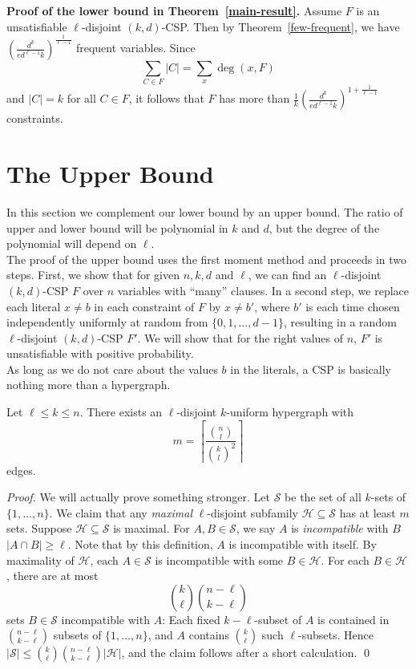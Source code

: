 \documentclass[envcountsect, envcountsame]{llncs}
\begin{document}
\textbf{Proof of the lower bound in Theorem~\ref{main-result}.}
Assume $F$ is an unsatisfiable $\ell$-disjoint $(k,d)$-CSP. Then by
Theorem~\ref{few-frequent}, we have
$\left(\frac{d^k}{ed^{\ell-1}k}\right)^{\frac{1}{\ell -1}}$ frequent
variables. Since
$$
\sum_{C\in F} |C| = \sum_x \deg(x,F)
$$
and $|C| = k$ for all $C\in F$, it follows that $F$ has more than
$\frac{1}{k} \left(\frac{d^k}{ed^{\ell
      -1}k}\right)^{1+\frac{1}{\ell-1}}$ constraints.

\section{The Upper Bound}

In this section we complement our lower bound by an upper bound. The
ratio of upper and lower bound will be polynomial in $k$ and $d$, but
the degree of the polynomial will depend on $\ell$.  \\

The proof of the upper bound uses the first moment method and proceeds
in two steps. First, we show that for given $n, k, d$ and $\ell$, we
can find an $\ell$-disjoint $(k,d)$-CSP $F$ over $n$ variables with
``many'' clauses. In a second step, we replace each literal $x \ne b$
in each constraint of $F$ by $x \ne b'$, where $b'$ is each time
chosen independently uniformly at random from $\{0,1,\dots,d-1\}$,
resulting in a random $\ell$-disjoint $(k,d)$-CSP $F'$.  We will show
that for the right values of $n$, $F'$ is unsatisfiable with positive
probability.\\

As long as we do not care about the values $b$ in the literals, a CSP
is basically nothing more than a hypergraph.

\begin{lemma}
  Let $\ell \leq k \leq n$. There exists an $\ell$-disjoint
  $k$-uniform hypergraph with
$$
m = \left\lceil\frac{{n \choose l}}{{k \choose l}^2}\right\rceil
$$
edges.
\label{large-hypergraph}
\end{lemma}

\begin{proof}
  We will actually prove something stronger. Let $\mathcal{S}$ be the
  set of all $k$-sets of $\{1,\dots,n\}$. We claim that any {\em
    maximal} $\ell$-disjoint subfamily $\mathcal{H} \subseteq
  \mathcal{S}$ has at least $m$ sets. Suppose $\mathcal{H} \subseteq
  \mathcal{S}$ is maximal. For $A,B \in \mathcal{S}$, we say $A$ is
  {\em incompatible} with $B$ $|A \cap B| \geq \ell$. Note that by
  this definition, $A$ is incompatible with itself.  By maximality of
  $\mathcal{H}$, each $A \in \mathcal{S}$ is incompatible with some $B
  \in \mathcal{H}$. For each $B \in \mathcal{H}$, there are at most
  $$
  {k \choose \ell}{n-\ell \choose k-\ell}
  $$
  sets $B \in \mathcal{S}$ incompatible with $A$: Each fixed
  $k-\ell$-subset of $A$ is contained in ${n-\ell \choose k-\ell}$
  subsets of $\{1,\dots,n\}$, and $A$ contains ${k \choose \ell}$ such
  $\ell$-subsets.  Hence $|\mathcal{S}| \leq {k \choose \ell}{n-\ell
    \choose k-\ell}|\mathcal{H}|$, and the claim follows after a short
  calculation.  \qed
\end{proof}
\end{document}
